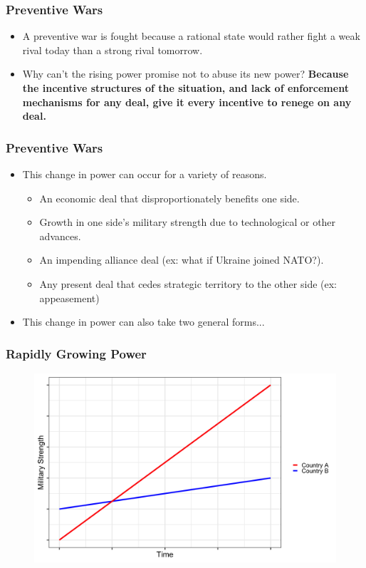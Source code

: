 \documentclass{beamer}
\begin{document}
\begin{frame} 
	\frametitle{\LARGE{Preventive Wars}}
	\begin{itemize}
		\item A preventive war is fought because a rational state would rather fight a weak rival today than a strong rival tomorrow. \pause
		\item Why can't the rising power promise not to abuse its new power? \pause \textbf{Because the incentive structures of the situation, and lack of enforcement mechanisms for any deal, give it every incentive to renege on any deal.}
	\end{itemize}
\end{frame}

\begin{frame} 
	\frametitle{\LARGE{Preventive Wars}}
	\begin{itemize}
		\item This change in power can occur for a variety of reasons. \pause
		\begin{itemize}
			\item An economic deal that disproportionately benefits one side. \pause
			\item Growth in one side's military strength due to technological or other advances. \pause
			\item An impending alliance deal (ex: what if Ukraine joined NATO?). \pause
			\item Any present deal that cedes strategic territory to the other side (ex: appeasement)
		\end{itemize}
		\item This change in power can also take two general forms...
	\end{itemize}
\end{frame}

\begin{frame} 
	\frametitle{\LARGE{Rapidly Growing Power}}
	\begin{figure}[ht!]
		\centering
		\includegraphics[height=.85\textheight, keepaspectratio]{./rapid_growth.png}
	\end{figure}
\end{frame}
\end{document}
